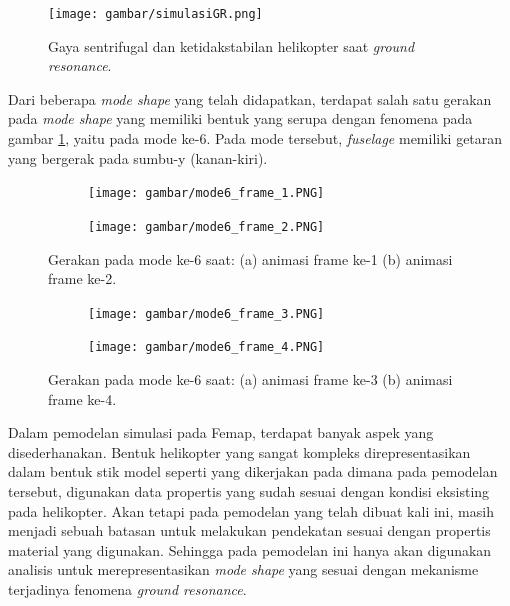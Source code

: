 \begin{figure}[H]
	\centering
	\texttt{[image: gambar/simulasiGR.png]}
	\caption{Gaya sentrifugal dan ketidakstabilan helikopter saat \textit{ground resonance}.}
	\label{fig:simulasiGR}
\end{figure}

Dari beberapa \textit{mode shape} yang telah didapatkan, terdapat salah satu gerakan pada \textit{mode shape} yang memiliki bentuk yang serupa dengan fenomena pada gambar \ref{fig:simulasiGR}, yaitu pada mode ke-6. Pada mode tersebut, \textit{fuselage} memiliki getaran yang bergerak pada sumbu-y (kanan-kiri).

\begin{figure}[H]
	\begin{subfigure}{0.49\textwidth}
		\centering
		\texttt{[image: gambar/mode6\_frame\_1.PNG]}
		\caption{}
		\label{fig:mode6_frame_1}
	\end{subfigure}
	\centering
	\begin{subfigure}{0.49\textwidth}
		\centering
		\texttt{[image: gambar/mode6\_frame\_2.PNG]}
		\caption{}
		\label{fig:mode6_frame_2}
	\end{subfigure}
	\caption{Gerakan pada mode ke-6 saat: (a) animasi frame ke-1 (b) animasi frame ke-2.}
\end{figure}

\begin{figure}[H]
	\begin{subfigure}{0.49\textwidth}
		\centering
		\texttt{[image: gambar/mode6\_frame\_3.PNG]}
		\caption{}
		\label{fig:mode6_frame_3}
	\end{subfigure}
	\centering
	\begin{subfigure}{0.49\textwidth}
		\centering
		\texttt{[image: gambar/mode6\_frame\_4.PNG]}
		\caption{}
		\label{fig:mode6_frame_4}
	\end{subfigure}
	\caption{Gerakan pada mode ke-6 saat: (a) animasi frame ke-3 (b) animasi frame ke-4.}
\end{figure}

Dalam pemodelan simulasi pada Femap, terdapat banyak aspek yang disederhanakan. Bentuk helikopter yang sangat kompleks direpresentasikan dalam bentuk stik model seperti yang dikerjakan pada \cite{Grzegorz2016THESP} dimana pada pemodelan tersebut, digunakan data propertis yang sudah sesuai dengan kondisi eksisting pada helikopter. Akan tetapi pada pemodelan yang telah dibuat kali ini, masih menjadi sebuah batasan untuk melakukan pendekatan sesuai dengan propertis material yang digunakan. Sehingga pada pemodelan ini hanya akan digunakan analisis untuk merepresentasikan \textit{mode shape} yang sesuai dengan mekanisme terjadinya fenomena \textit{ground resonance}.

